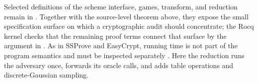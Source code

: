 Selected definitions of the scheme interface, games, transform,
and reduction remain in .  Together with
the source-level theorem above, they expose the small specification surface on
which a cryptographic audit should concentrate; the Rocq kernel checks that the
remaining proof terms connect that surface by the argument in
.  As in SSProve and EasyCrypt, running time is not
part of the program semantics and must be inspected separately
\cite{easycrypt,ssprove}.  Here the
reduction runs the adversary once, forwards its oracle calls, and adds table
operations and discrete-Gaussian sampling.

